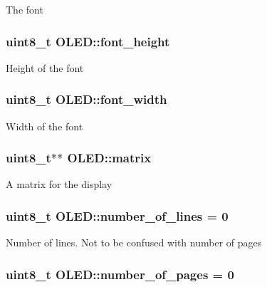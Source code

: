 The font \hypertarget{class_o_l_e_d_a85b91421932866dea031921799ba83a3}{
\subsubsection[{font\-\_\-height}]{\setlength{\rightskip}{0pt plus 5cm}uint8\-\_\-t O\-L\-E\-D\-::font\-\_\-height\hspace{0.3cm}{\ttfamily [private]}}}\label{class_o_l_e_d_a85b91421932866dea031921799ba83a3}
Height of the font \hypertarget{class_o_l_e_d_a3c9ea103adf6c860a2534135e9a25ba8}{
\subsubsection[{font\-\_\-width}]{\setlength{\rightskip}{0pt plus 5cm}uint8\-\_\-t O\-L\-E\-D\-::font\-\_\-width\hspace{0.3cm}{\ttfamily [private]}}}\label{class_o_l_e_d_a3c9ea103adf6c860a2534135e9a25ba8}
Width of the font \hypertarget{class_o_l_e_d_a9d32e21189940afba24deab0a2bc0126}{
\subsubsection[{matrix}]{\setlength{\rightskip}{0pt plus 5cm}uint8\-\_\-t$\ast$$\ast$ O\-L\-E\-D\-::matrix\hspace{0.3cm}{\ttfamily [private]}}}\label{class_o_l_e_d_a9d32e21189940afba24deab0a2bc0126}
A matrix for the display \hypertarget{class_o_l_e_d_a9ea1c55112deede1a61142af276a6bc9}{
\subsubsection[{number\-\_\-of\-\_\-lines}]{\setlength{\rightskip}{0pt plus 5cm}uint8\-\_\-t O\-L\-E\-D\-::number\-\_\-of\-\_\-lines = 0\hspace{0.3cm}{\ttfamily [private]}}}\label{class_o_l_e_d_a9ea1c55112deede1a61142af276a6bc9}
Number of lines. Not to be confused with number of pages \hypertarget{class_o_l_e_d_aaac99b0eb4e9dfe92b8571488dc89288}{
\subsubsection[{number\-\_\-of\-\_\-pages}]{\setlength{\rightskip}{0pt plus 5cm}uint8\-\_\-t O\-L\-E\-D\-::number\-\_\-of\-\_\-pages = 0\hspace{0.3cm}{\ttfamily [private]}}}\label{class_o_l_e_d_aaac99b0eb4e9dfe92b8571488dc89288}
